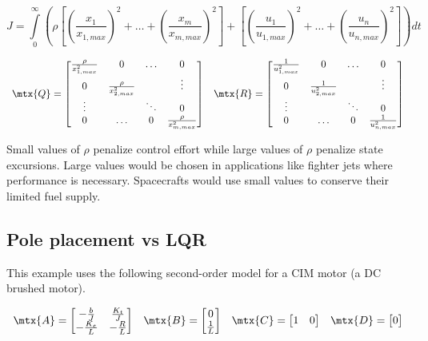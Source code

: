 \begin{equation*}
  J = \int\limits_0^\infty \left(\rho \left[
    \left(\frac{x_1}{x_{1,max}}\right)^2 + \ldots +
    \left(\frac{x_m}{x_{m,max}}\right)^2\right] + \left[
    \left(\frac{u_1}{u_{1,max}}\right)^2 + \ldots +
    \left(\frac{u_n}{u_{n,max}}\right)^2\right]\right) dt
\end{equation*}

\begin{equation*}
  \begin{array}{cc}
    \mtx{Q} = \begin{bmatrix}
      \frac{\rho}{x_{1,max}^2} & 0 & \ldots & 0 \\
      0 & \frac{\rho}{x_{2,max}^2} & & \vdots \\
      \vdots & & \ddots & 0 \\
      0 & \ldots & 0 & \frac{\rho}{x_{m,max}^2}
    \end{bmatrix} &
    \mtx{R} = \begin{bmatrix}
      \frac{1}{u_{1,max}^2} & 0 & \ldots & 0 \\
      0 & \frac{1}{u_{2,max}^2} & & \vdots \\
      \vdots & & \ddots & 0 \\
      0 & \ldots & 0 & \frac{1}{u_{n,max}^2}
    \end{bmatrix}
  \end{array}
\end{equation*}

Small values of $\rho$ penalize \gls{control effort} while large values of
$\rho$ penalize \gls{state} excursions. Large values would be chosen in
applications like fighter jets where performance is necessary. Spacecrafts would
use small values to conserve their limited fuel supply.

\subsection{Pole placement vs LQR}

This example uses the following second-order \gls{model} for a CIM motor (a DC
brushed motor).

\begin{align*}
  \begin{array}{cccc}
    \mtx{A} = \begin{bmatrix}
      -\frac{b}{J} & \frac{K_t}{J} \\
      -\frac{K_e}{L} & -\frac{R}{L}
    \end{bmatrix} &
    \mtx{B} = \begin{bmatrix}
      0 \\
      \frac{1}{L}
    \end{bmatrix} &
    \mtx{C} = \begin{bmatrix}
      1 & 0
    \end{bmatrix} &
    \mtx{D} = \begin{bmatrix}
      0
    \end{bmatrix}
  \end{array}
\end{align*}

